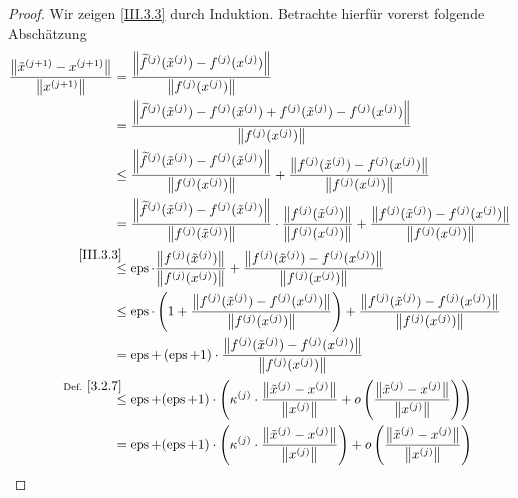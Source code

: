\begin{Leme}[Fehlerfortpflanzung]
  \begin{proof}
    Wir zeigen \ref{III.3.3} durch Induktion.
    Betrachte hierfür vorerst folgende Abschätzung
    \begin{align*}
      \frac{\nn[\tilde{x}^{(j+1)}-x^{(j+1)}]}{\nn[x^{(j+1)}]}
      &= \frac{\nn[\widetilde{f}^{(j)}(\tilde{x}^{(j)})-f^{(j)}(x^{(j)})]}
        {\nn[f^{(j)}(x^{(j)})]} \\
      &= \frac{\nn[\widetilde{f}^{(j)}(\tilde{x}^{(j)})
        -f^{(j)}(\tilde{x}^{(j)})
        +f^{(j)}(\tilde{x}^{(j)})
        -f^{(j)}(x^{(j)})]}
        {\nn[f^{(j)}(x^{(j)})]} \\
      &\leq \frac{\nn[\widetilde{f}^{(j)}(\tilde{x}^{(j)})
        -f^{(j)}(\tilde{x}^{(j)})]}
        {\nn[f^{(j)}(x^{(j)})]}
        +\frac{\nn[f^{(j)}(\tilde{x}^{(j)}) - f^{(j)}(x^{(j)})]}
        {\nn[f^{(j)}(x^{(j)})]} \\
      &= \frac{\nn[\widetilde{f}^{(j)}(\tilde{x}^{(j)})
        -f^{(j)}(\tilde{x}^{(j)})]}
        {\nn[f^{(j)}(\tilde{x}^{(j)})]}
        \cdot \frac{\nn[f^{(j)}(\tilde{x}^{(j)})]}
        {\nn[f^{(j)}(x^{(j)})]}
        +\frac{\nn[f^{(j)}(\tilde{x}^{(j)}) - f^{(j)}(x^{(j)})]}
        {\nn[f^{(j)}(x^{(j)})]} \\
      &\overset{\mathllap{\ref{III.3.3}}}{\leq}
        \Eps\cdot \frac{\nn[f^{(j)}(\tilde{x}^{(j)})]}
        {\nn[f^{(j)}(x^{(j)})]}
        +\frac{\nn[f^{(j)}(\tilde{x}^{(j)})-f^{(j)}(x^{(j)})]}
        {\nn[f^{(j)}(x^{(j)})]} \\
      &\leq \Eps\cdot\left( 
        1 + \frac{\nn[f^{(j)}(\tilde{x}^{(j)})-f^{(j)}(x^{(j)})]}
        {\nn[f^{(j)}(x^{(j)})]}
        \right)
        + \frac{\nn[f^{(j)}(\tilde{x}^{(j)})-f^{(j)}(x^{(j)})]}
        {\nn[f^{(j)}(x^{(j)})]}\\
      &= \Eps + \left( \Eps+1 \right)
        \cdot \frac{\nn[f^{(j)}(\tilde{x}^{(j)})-f^{(j)}(x^{(j)})]}
        {\nn[f^{(j)}(x^{(j)})]}\\      
      &\overset{\mathllap{\text{Def. }\ref{3.2.7}}}{\leq} 
        \Eps + (\Eps+1) \cdot
        \left(
        \kappa^{(j)}\cdot \frac{\nn[\tilde{x}^{(j)}-x^{(j)}]}{\nn[x^{(j)}]}
        + o\left( 
        \frac{\nn[\tilde{x}^{(j)}-x^{(j)}]}{\nn[x^{(j)}]}
        \right)
        \right)\\
      &= \Eps + (\Eps+1) \cdot
        \left(
        \kappa^{(j)}\cdot \frac{\nn[\tilde{x}^{(j)}-x^{(j)}]}{\nn[x^{(j)}]}
        \right)
        + o\left( 
        \frac{\nn[\tilde{x}^{(j)}-x^{(j)}]}{\nn[x^{(j)}]}
        \right)
    \end{align*}

\end{proof}
\end{Leme}
